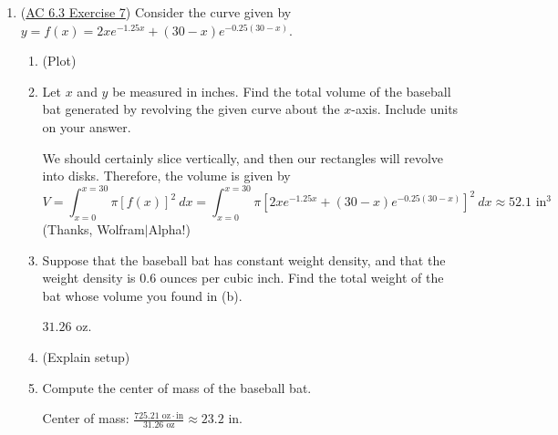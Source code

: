 \begin{enumerate}[leftmargin=0pt]
\begin{enumerate}
\begin{enumerate}
        \begin{red}
            $\dfrac{28.7317}{ 7.7923} \approx 3.6872\text{ cm}$
        \end{red}
    \end{enumerate}
\end{enumerate}

\item (\href{https://faculty.gvsu.edu/boelkinm/Home/ACS/sec-6-3-mass.html#GXW}{AC 6.3 Exercise 7}) Consider the curve given by $y = f(x) = 2xe^{-1.25x} + (30-x) e^{-0.25(30-x)}\text{.}$
\begin{enumerate}
    \item (Plot)
    
    \item Let $x$ and $y$ be measured in inches. Find the total volume of the baseball bat generated by revolving the given curve about the $x$-axis. Include units on your answer.
    
    \begin{red}
    We should certainly slice vertically, and then our rectangles will revolve into disks. Therefore, the volume is given by
    \[V = \int_{x=0}^{x=30} \pi [f(x)]^2\ dx = \int_{x=0}^{x=30} \pi [2xe^{-1.25x} + (30-x) e^{-0.25(30-x)}]^2\ dx \approx 52.1 \text{ in}^3 \]
    (Thanks, Wolfram$\mid$Alpha!)
    \end{red}
    
    \item Suppose that the baseball bat has constant weight density, and that the weight density is $0.6$ ounces per cubic inch. Find the total weight of the bat whose volume you found in (b).
    
    \begin{red} $31.26$ oz.
    \end{red}
    
    \item (Explain setup) 
    
    \item Compute the center of mass of the baseball bat.
    
    \begin{red}Center of mass: $\frac{725.21 \text{ oz}\cdot\text{in}}{31.26\text{ oz}} \approx 23.2$ in.
    \end{red}
    
    
\end{enumerate}

\end{enumerate}
